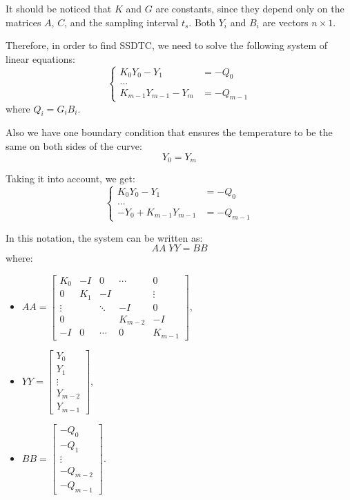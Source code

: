 It should be noticed that $K$ and $G$ are constants, since they depend only on the matrices $A$, $C$, and the sampling interval $t_s$.  Both $Y_i$ and $B_i$ are vectors $n \times 1$.

Therefore, in order to find SSDTC, we need to solve the following system of linear equations:
\[
  \begin{cases}
    K_0 Y_0 - Y_1 & = -Q_0 \\
    ... \\
    K_{m-1} Y_{m-1} - Y_{m} & = -Q_{m-1}
  \end{cases}
\]
where $Q_i = G_i B_i$.

Also we have one boundary condition that ensures the temperature to be the same on both sides of the curve:
\begin{equation} \label{eq:boundary-condition}
  Y_0 = Y_m
\end{equation}

Taking it into account, we get:
\[
  \begin{cases}
    K_0 Y_0 - Y_1 & =-Q_0 \\
    ... \\
    -Y_0 + K_{m-1} Y_{m-1} & = -Q_{m-1}
  \end{cases}
\]

In this notation, the system can be written as:
\begin{equation} \label{eq:system}
  AA \; YY = BB
\end{equation}
where:
\begin{itemize}
  \item
    $AA = \left[
      \begin{array}{ccccc}
        K_0 & -I & 0 & \cdots & 0 \\
        0 & K_1 & -I &  & \vdots \\
        \vdots &  & \ddots & -I & 0 \\
        0 &  &  & K_{m-2} & -I \\
        -I & 0 & \cdots & 0 & K_{m-1}
      \end{array}
    \right]$,

  \item
    $YY = \left[
      \begin{array}{c}
        Y_0 \\
        Y_1 \\
        \vdots \\
        Y_{m-2} \\
        Y_{m-1}
      \end{array}
    \right]$,

  \item $BB = \left[
    \begin{array}{c}
      -Q_0 \\
      -Q_1 \\
      \vdots \\
      -Q_{m-2} \\
      -Q_{m-1}
    \end{array}
  \right]$.
\end{itemize}

